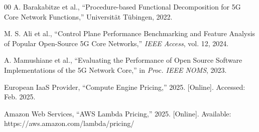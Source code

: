 \documentclass[conference]{IEEEtran}
\begin{document}
\begin{thebibliography}{00}
A. Barakabitze et al., ``Procedure-based Functional Decomposition for 5G Core Network Functions,'' Universit\"{a}t T\"{u}bingen, 2022.

M. S. Ali et al., ``Control Plane Performance Benchmarking and Feature Analysis of Popular Open-Source 5G Core Networks,'' \textit{IEEE Access}, vol. 12, 2024.

A. Mamushiane et al., ``Evaluating the Performance of Open Source Software Implementations of the 5G Network Core,'' in \textit{Proc. IEEE NOMS}, 2023.

European IaaS Provider, ``Compute Engine Pricing,'' 2025. [Online]. Accessed: Feb. 2025.

Amazon Web Services, ``AWS Lambda Pricing,'' 2025. [Online]. Available: https://aws.amazon.com/lambda/pricing/

\end{thebibliography}

\balance
\end{document}

